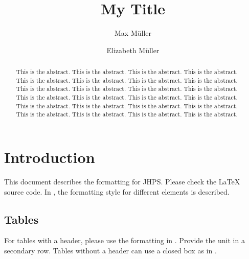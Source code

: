 \documentclass{jhps}
\begin{document}

\title{My Title}
\author{
        Max Müller
        \and Elizabeth Müller
}


\maketitle

\begin{abstract}
This is the abstract. This is the abstract. This is the abstract. This is the abstract. This is the abstract. This is the abstract. This is the abstract. This is the abstract. This is the abstract. This is the abstract. This is the abstract. This is the abstract. This is the abstract. This is the abstract. This is the abstract. This is the abstract. This is the abstract. This is the abstract. This is the abstract. This is the abstract. This is the abstract. This is the abstract. This is the abstract. This is the abstract.
\end{abstract}

\section{Introduction}
\label{sec:intro}

This document describes the formatting for JHPS.
Please check the LaTeX source code. In , the formatting style for different elements is described.

\subsection{Tables}

For tables with a header, please use the formatting in .
Provide the unit in a secondary row.
Tables without a header can use a closed box as in .
\end{document}
